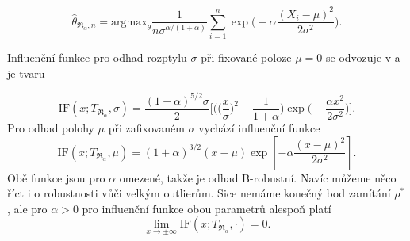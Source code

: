 \begin{equation}
	\hat{\theta}_{\mathfrak{R}_\alpha,n} = \text{argmax}_{\theta} \frac{1}{n\sigma^{\alpha/(1+\alpha)}}\sum_{i=1}^n\exp \biggl(-\alpha\frac{(X_i-\mu)^2}{2\sigma^2}\biggr).
\end{equation}

\noindent Influenční funkce pro odhad rozptylu $\sigma$ při fixované poloze $\mu = 0$ se odvozuje v \cite{Vajda2009} a je tvaru 

\begin{equation}
	\text{IF}(x;T_{\mathfrak{R}_{\alpha}},\sigma) = \frac{(1+\alpha)^{5/2}\sigma}{2}\biggl[\biggl(\biggl(\frac{x}{\sigma}\biggr)^2-\frac{1}{1+\alpha}\biggr) \exp\biggl(-\frac{\alpha x^2}{2\sigma^2}\biggr)\biggr].
\end{equation}
Pro odhad polohy $\mu$ při zafixovaném  $\sigma$ vychází influenční funkce
\begin{equation}
	\text{IF}(x;T_{\mathfrak{R}_{\alpha}},\mu) = (1+\alpha )^{3/2} (x-\mu ) \exp\left[{-\alpha\frac{(x-\mu )^2}{2 \sigma ^2}}\right].
\end{equation}
Obě funkce jsou pro $\alpha$ omezené, takže je odhad B-robustní. Navíc můžeme něco říct i o robustnosti vůči velkým outlierům. Sice nemáme konečný bod zamítání $\rho^*$, ale pro $\alpha>0$ pro influenční funkce obou parametrů alespoň platí 
\begin{equation}
	\lim_{x \rightarrow \pm\infty} \mathrm{IF}(x;T_{\mathfrak{R}_\alpha},\cdot) = 0.
\end{equation}




